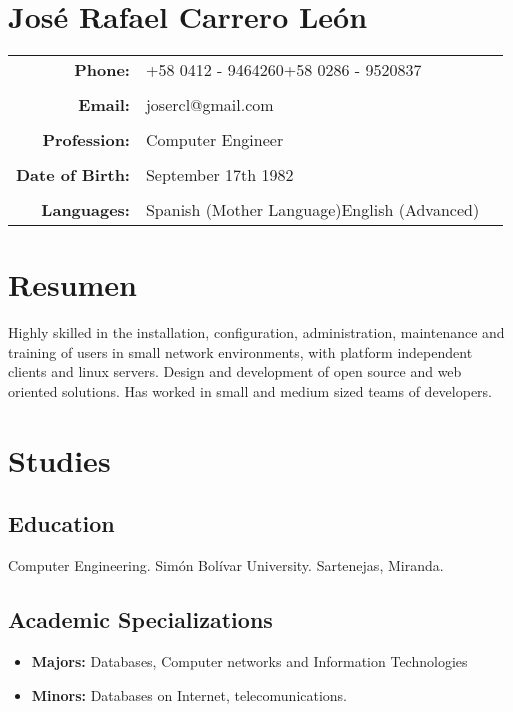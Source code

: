\documentclass[letterpaper,11pt]{report}
\begin{document}
\section*{José Rafael Carrero León}

\begin{tabular}{r p{2.4in} p{46mm}}
\textbf{Phone:}&+58 0412 - 9464260\newline +58 0286 - 9520837&\\
 & & \\
\textbf{Email:}&josercl@gmail.com&\\
 & & \\
\textbf{Profession:}&Computer Engineer&\\
 & & \\
\textbf{Date of Birth:}&September 17th 1982&\\
 & & \\
\textbf{Languages:}&Spanish (Mother Language)\newline English (Advanced)&\\
\end{tabular}


\section*{Resumen}
Highly skilled in the installation, configuration, administration, maintenance and training of users in small network environments, with
platform independent clients and linux servers. Design and development of open source and web oriented solutions. Has worked in small and medium 
sized teams of developers.

\section*{Studies}
\subsection*{Education}
Computer Engineering. Simón Bolívar University. Sartenejas, Miranda.
\subsection*{Academic Specializations}
\begin{itemize}
\item
\textbf{Majors:} Databases, Computer networks and Information Technologies
\item
\textbf{Minors:} Databases on Internet, telecomunications.
\end{itemize}
\end{document}
